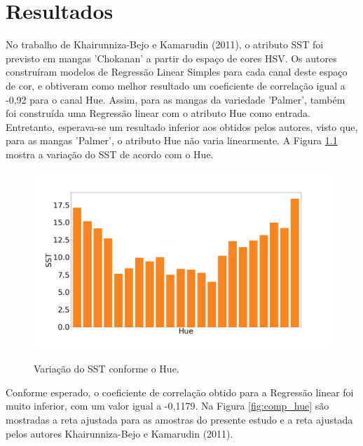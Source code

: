 \chapter{Resultados} \label{ch:RD}

No trabalho de Khairunniza-Bejo e Kamarudin (2011), o atributo SST foi previsto em mangas 'Chokanan' a partir do espaço de cores HSV. Os autores construíram modelos de Regressão Linear Simples para cada canal deste espaço de cor, e obtiveram como melhor resultado um coeficiente de correlação igual a -0,92 para o canal Hue. Assim, para as mangas da variedade 'Palmer', também foi construída uma Regressão linear com o atributo Hue como entrada. Entretanto, esperava-se um resultado inferior aos obtidos pelos autores, visto que, para as mangas 'Palmer', o atributo Hue não varia linearmente. A Figura \ref{fig:hue_sst} mostra a variação do SST de acordo com o Hue. 

\begin{figure}[H]
\centering
	\caption{Variação do SST conforme o Hue.}
	\includegraphics[scale=0.18]{img/hue_sst_palmer.png}
	\label{fig:hue_sst}
\end{figure}

Conforme esperado, o coeficiente de correlação obtido para a Regressão linear foi muito inferior, com um valor igual a -0,1179. Na Figura \ref{fig:comp_hue} são mostradas a reta ajustada para as amostras do presente estudo e a reta ajustada pelos autores Khairunniza-Bejo e Kamarudin (2011).

